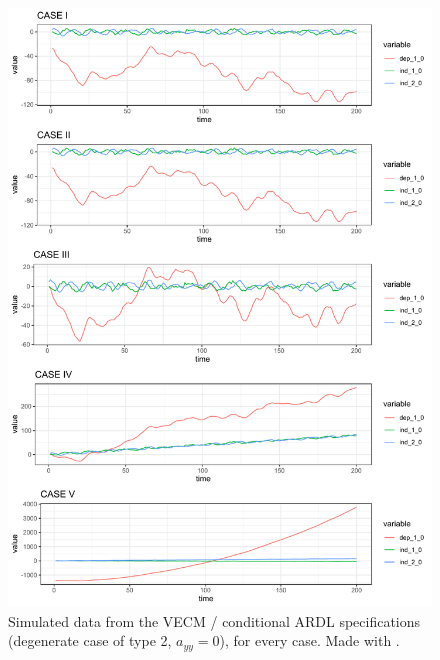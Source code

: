 \begin{figure}[ht!]
\begin{center}
\includegraphics[width=13.5cm]{figures/sim_ts_D2}
\end{center}
\caption{Simulated data from the VECM / conditional ARDL specifications (degenerate case of type 2, $a_{yy}=0$), for every case. Made with .}
\label{fig:sim2}
\end{figure}
\newpage
